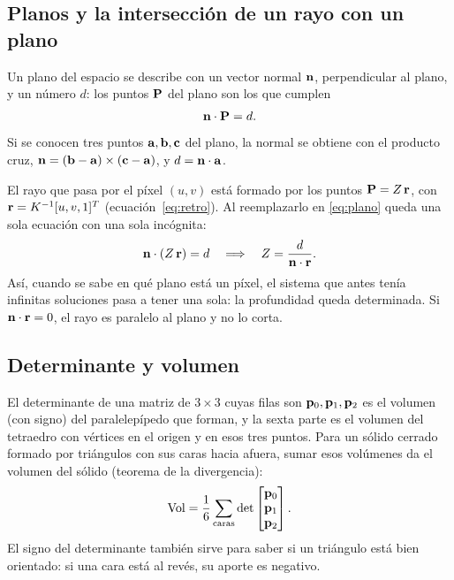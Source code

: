 \subsection{Planos y la intersección de un rayo con un plano}

Un plano del espacio se describe con un vector normal $\mathbf{n}$, perpendicular
al plano, y un número $d$: los puntos $\mathbf{P}$ del plano son los que cumplen
\begin{equation}
\mathbf{n}\cdot\mathbf{P} = d.
\label{eq:plano}
\end{equation}
Si se conocen tres puntos $\mathbf{a},\mathbf{b},\mathbf{c}$ del plano, la normal se
obtiene con el producto cruz, $\mathbf{n}=(\mathbf{b}-\mathbf{a})\times(\mathbf{c}-\mathbf{a})$,
y $d=\mathbf{n}\cdot\mathbf{a}$.

El rayo que pasa por el píxel $(u,v)$ está formado por los puntos
$\mathbf{P}=Z\,\mathbf{r}$, con $\mathbf{r}=K^{-1}[u,v,1]^{T}$
(ecuación~\eqref{eq:retro}). Al reemplazarlo en \eqref{eq:plano} queda una sola
ecuación con una sola incógnita:
\begin{equation}
\mathbf{n}\cdot(Z\,\mathbf{r}) = d \quad\Longrightarrow\quad Z = \frac{d}{\mathbf{n}\cdot\mathbf{r}}.
\label{eq:rayo-plano}
\end{equation}
Así, cuando se sabe en qué plano está un píxel, el sistema que antes tenía
infinitas soluciones pasa a tener una sola: la profundidad queda determinada.
Si $\mathbf{n}\cdot\mathbf{r}=0$, el rayo es paralelo al plano y no lo corta.

\subsection{Determinante y volumen}

El determinante de una matriz de $3\times3$ cuyas filas son
$\mathbf{p}_0,\mathbf{p}_1,\mathbf{p}_2$ es el volumen (con signo) del
paralelepípedo que forman, y la sexta parte es el volumen del tetraedro con
vértices en el origen y en esos tres puntos. Para un sólido cerrado formado por
triángulos con sus caras hacia afuera, sumar esos volúmenes da el volumen del
sólido (teorema de la divergencia):
\begin{equation}
\mathrm{Vol} = \frac{1}{6}\sum_{\text{caras}} \det\begin{bmatrix}\mathbf{p}_0\\ \mathbf{p}_1\\ \mathbf{p}_2\end{bmatrix}.
\label{eq:volumen}
\end{equation}
El signo del determinante también sirve para saber si un triángulo está bien
orientado: si una cara está al revés, su aporte es negativo.

